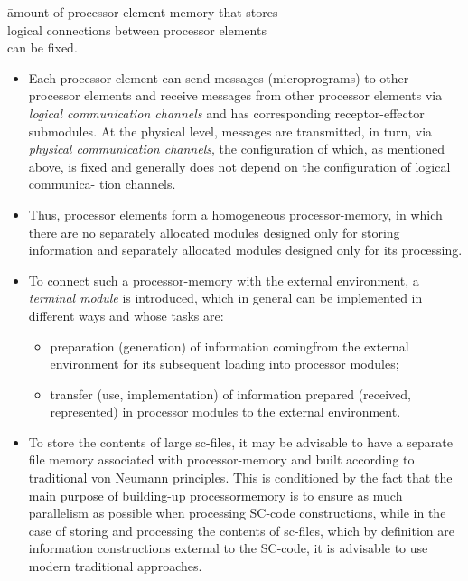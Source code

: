 \documentclass{article}
\begin{document}
\begin{multicols}{2}

\begin{tabbing}
	\hspace{1cm} \= amount of processor element memory that stores \\ \> logical connections between processor elements \\ \> can be fixed.
\end{tabbing}

	\begin{itemize}
		\item Each processor element can send messages (microprograms) to other processor elements and receive	messages from other processor elements via \textit{logical communication channels} and has corresponding receptor-effector submodules. At the physical level, messages are transmitted, in turn, via \textit{physical communication channels}, the configuration of which, as mentioned above, is fixed and generally does not depend on the configuration of logical communica- tion channels.
	
		\item Thus, processor elements form a homogeneous processor-memory, in which there are no separately allocated modules designed only for storing information and separately allocated modules designed only for its processing.
	
		\item To connect such a processor-memory with the external environment, a \textit{terminal module} is introduced, which in general can be implemented in different ways and whose tasks are:
	
		\begin{itemize}
			\item preparation (generation) of information comingfrom the external environment for its subsequent loading into processor modules;
		
			\item transfer (use, implementation) of information prepared (received, represented) in processor modules to the external environment.
		\end{itemize}

		\item To store the contents of large sc-files, it may be advisable to have a separate file memory associated with processor-memory and built according to traditional von Neumann principles. This is conditioned by the fact that the main purpose of building-up processormemory is to ensure as much parallelism as possible when processing SC-code constructions, while in the case of storing and processing the contents of sc-files, which by definition are information constructions external to the SC-code, it is advisable to use modern traditional approaches.
	\end{itemize}


\end{multicols}
\end{document}
